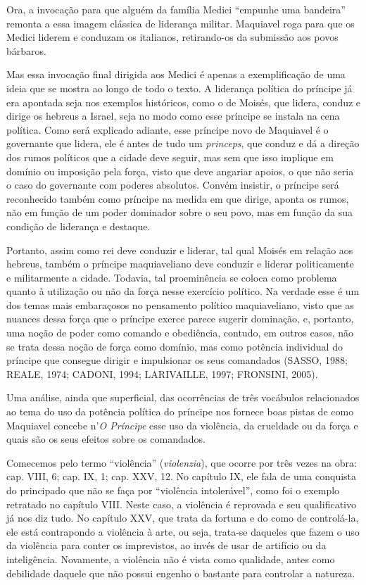 Ora, a invocação para que alguém da família Medici ``empunhe uma
bandeira'' remonta a essa imagem clássica de liderança militar.
Maquiavel roga para que os Medici liderem e conduzam os italianos,
retirando-os da submissão aos povos bárbaros.

Mas essa invocação final dirigida aos Medici é apenas a exemplificação
de uma ideia que se mostra ao longo de todo o texto. A liderança
política do príncipe já era apontada seja nos exemplos históricos, como
o de Moisés, que lidera, conduz e dirige os hebreus a Israel, seja no
modo como esse príncipe se instala na cena política. Como será explicado
adiante, esse príncipe novo de Maquiavel é o governante que lidera, ele
é antes de tudo um \emph{princeps}, que conduz e dá a direção dos rumos
políticos que a cidade deve seguir, mas sem que isso implique em domínio
ou imposição pela força, visto que deve angariar apoios, o que não seria
o caso do governante com poderes absolutos. Convém insistir, o príncipe
será reconhecido também como príncipe na medida em que dirige, aponta os
rumos, não em função de um poder dominador sobre o seu povo, mas em
função da sua condição de liderança e destaque.

Portanto, assim como rei deve conduzir e liderar, tal qual Moisés em
relação aos hebreus, também o príncipe maquiaveliano deve conduzir e
liderar politicamente e militarmente a cidade. Todavia, tal proeminência
se coloca como problema quanto à utilização ou não da força nesse
exercício político. Na verdade esse é um dos temas mais embaraçosos no
pensamento político maquiaveliano, visto que as nuances dessa força que
o príncipe exerce parece sugerir dominação, e, portanto, uma noção de
poder como comando e obediência, contudo, em outros casos, não se trata
dessa noção de força como domínio, mas como potência individual do
príncipe que consegue dirigir e impulsionar os seus comandados (SASSO,
1988; REALE, 1974; CADONI, 1994; LARIVAILLE, 1997; FRONSINI, 2005).

Uma análise, ainda que superficial, das ocorrências de três vocábulos
relacionados ao tema do uso da potência política do príncipe nos fornece
boas pistas de como Maquiavel concebe n'\emph{O Príncipe} esse uso da
violência, da crueldade ou da força e quais são os seus efeitos sobre os
comandados.

Comecemos pelo termo ``violência'' (\emph{violenzia}), que ocorre por
três vezes na obra: cap. VIII, 6; cap. IX, 1; cap. XXV, 12. No capítulo
IX, ele fala de uma conquista do principado que não se faça por
``violência intolerável'', como foi o exemplo retratado no capítulo
VIII. Neste caso, a violência é reprovada e seu qualificativo já nos diz
tudo. No capítulo XXV, que trata da fortuna e do como de controlá-la,
ele está contrapondo a violência à arte, ou seja, trata-se daqueles que
fazem o uso da violência para conter os imprevistos, ao invés de usar de
artifício ou da inteligência. Novamente, a violência não é vista como
qualidade, antes como debilidade daquele que não possui engenho o
bastante para controlar a natureza.

